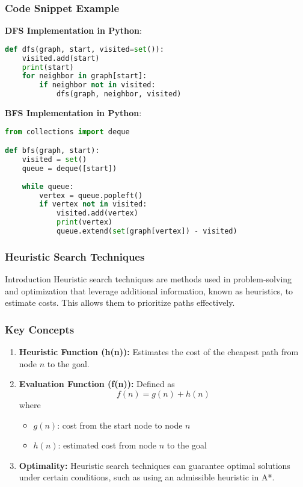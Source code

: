 \documentclass[aspectratio=169]{beamer}
\begin{document}
\begin{frame}[fragile]
    \frametitle{Code Snippet Example}
    \textbf{DFS Implementation in Python}:
    \begin{lstlisting}[language=Python]
def dfs(graph, start, visited=set()):
    visited.add(start)
    print(start)
    for neighbor in graph[start]:
        if neighbor not in visited:
            dfs(graph, neighbor, visited)
    \end{lstlisting}

    \vspace{1em}

    \textbf{BFS Implementation in Python}:
    \begin{lstlisting}[language=Python]
from collections import deque

def bfs(graph, start):
    visited = set()
    queue = deque([start])
    
    while queue:
        vertex = queue.popleft()
        if vertex not in visited:
            visited.add(vertex)
            print(vertex)
            queue.extend(set(graph[vertex]) - visited)
    \end{lstlisting}
\end{frame}

\begin{frame}[fragile]
    \frametitle{Heuristic Search Techniques}
    \begin{block}{Introduction}
        Heuristic search techniques are methods used in problem-solving and optimization that leverage additional information, known as heuristics, to estimate costs. This allows them to prioritize paths effectively.
    \end{block}
\end{frame}

\begin{frame}[fragile]
    \frametitle{Key Concepts}
    \begin{enumerate}
        \item \textbf{Heuristic Function (h(n)):} Estimates the cost of the cheapest path from node \( n \) to the goal.
        \item \textbf{Evaluation Function (f(n)):} Defined as 
        \begin{equation}
            f(n) = g(n) + h(n)
        \end{equation}
        where 
        \begin{itemize}
            \item \( g(n) \): cost from the start node to node \( n \)
            \item \( h(n) \): estimated cost from node \( n \) to the goal
        \end{itemize}
        \item \textbf{Optimality:} Heuristic search techniques can guarantee optimal solutions under certain conditions, such as using an admissible heuristic in A*.
    \end{enumerate}
\end{frame}
\end{document}
